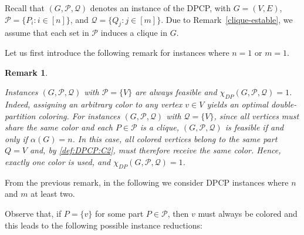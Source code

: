 \documentclass[preprint, 11pt, authoryear]{elsarticle}
\newtheorem{remark}{Remark}[section]
\newcommand{\PP}{{\mathcal P}}
\newcommand{\QQ}{{\mathcal Q}}
\newcommand{\dpcn}[1]{\chi_{DP}(#1)}
\begin{document}
Recall that $(G,\PP,\QQ)$ denotes an instance of the DPCP, with $G=(V,E)$, $\PP = \{P_i : i \in [n]\}$, and $\QQ = \{Q_j : j \in [m]\}$.
Due to Remark~\ref{clique-estable}, we assume that each set in $\PP$ induces a clique in $G$. 

Let us first introduce the following remark for instances where $n=1$ or $m=1$.

\begin{remark} \label{nm_igual1}


Instances $(G,\PP,\QQ)$ with $\PP = \{V\}$ are always feasible and $\dpcn{G, \PP, \QQ} = 1$. Indeed, assigning an arbitrary color to any vertex $v \in V$ yields an optimal double-partition coloring. For instances $(G,\PP,\QQ)$ with $\QQ = \{V\}$, since all vertices must share the same color and each $P \in \PP$ is a clique, $(G,\PP,\QQ)$ is feasible if and only if $\alpha(G) = n$. 
In this case, all colored vertices belong to the same part $Q=V$ and, by \ref{def:DPCP:C2}, must therefore receive the same color. Hence, exactly one color is used, and $\dpcn{G, \PP, \QQ} = 1$.
\end{remark}

From the previous remark, in the following we consider DPCP instances where $n$ and $m$ at least two.


Observe that, if
$P = \{v\}$ for some part $P \in \PP$, then $v$ must always be colored and this leads to the following possible instance reductions:
\end{document}
